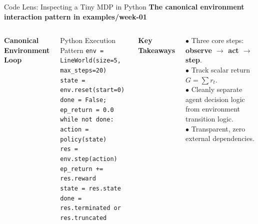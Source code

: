 \documentclass[aspectratio=169,10pt]{beamer}
\newcommand{\sectionlabel}[1]{%
  {\small\bfseries\color{islteal}#1}\par\vspace{0.14cm}%
}
\begin{document}
\begin{frame}[fragile]{Code Lens: Inspecting a Tiny MDP in Python}
  \sectionlabel{The canonical environment interaction pattern in examples/week-01}

  \begin{columns}[T,onlytextwidth]
      {\small\bfseries\color{islteal} Canonical Environment Loop}\par\vspace{0.06cm}
      {\footnotesize
      \begin{block}{\footnotesize Python Execution Pattern}
\texttt{env = LineWorld(size=5, max\_steps=20)}\\
\texttt{state = env.reset(start=0)}\\
\texttt{done = False; ep\_return = 0.0}\\[3pt]
\texttt{while not done:}\\
\texttt{\quad action = policy(state)}\\
\texttt{\quad res = env.step(action)}\\
\texttt{\quad ep\_return += res.reward}\\
\texttt{\quad state = res.state}\\
\texttt{\quad done = res.terminated or res.truncated}
      \end{block}}

      {\small\bfseries\color{islnavy} Key Takeaways}\par\vspace{0.06cm}
      {\footnotesize
      $\bullet$ Three core steps: \textbf{observe $\to$ act $\to$ step}.\\[2pt]
      $\bullet$ Track scalar return $G = \sum r_t$.\\[2pt]
      $\bullet$ Cleanly separate agent decision logic from environment transition logic.\\[2pt]
      $\bullet$ Transparent, zero external dependencies.}
  \end{columns}
\end{frame}
\end{document}
